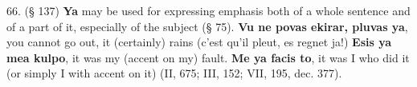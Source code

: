 66. (§ 137) \textbf{Ya} may be used for expressing emphasis both of a whole sentence and of a part of it, especially of the subject (§ 75). \textbf{Vu ne povas ekirar, pluvas ya}, you cannot go out, it (certainly) rains (c'est qu'il pleut, es regnet ja!) \textbf{Esis ya mea kulpo}, it was my (accent on my) fault. \textbf{Me ya facis to}, it was I who did it (or simply I with accent on it) (II, 675; III, 152; VII, 195, dec. 377). %